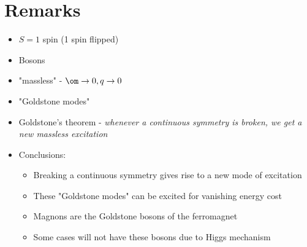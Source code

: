 \documentclass[a4paper, 11pt, normalem]{report}
\begin{document}
\section{Remarks}

\begin{itemize}
    \item $S=1$ spin (1 spin flipped)
    \item Bosons
    \item "massless" - $\om \to 0, q \to 0$
    \item "Goldstone modes"
    \item Goldstone's theorem - \emph{whenever a continuous symmetry is broken, we get a new massless excitation}
    \item Conclusions:
        \begin{itemize}
            \item Breaking a continuous symmetry gives rise to a new mode of excitation
            \item These "Goldstone modes" can be excited for vanishing energy cost
            \item Magnons are the Goldstone bosons of the ferromagnet
            \item Some cases will not have these bosons due to Higgs mechanism
        \end{itemize}
\end{itemize}
\end{document}
